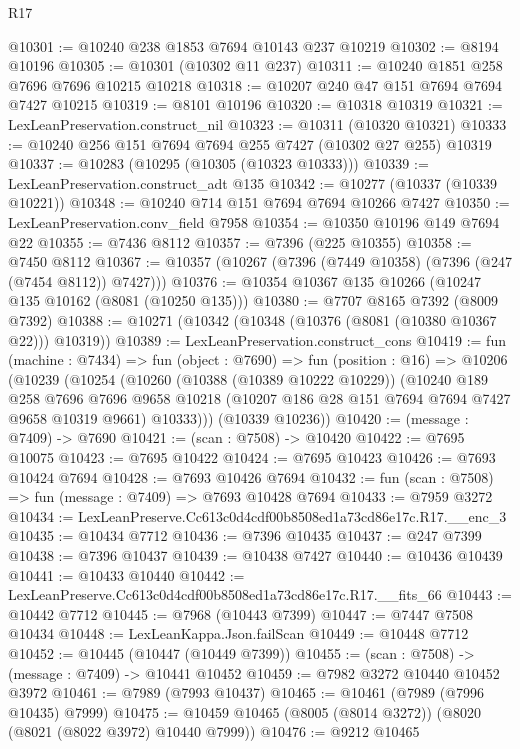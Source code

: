 \begin{lexlean}{R17}
\begin{coremodule}
@10301 := @10240 @238 @1853 @7694 @10143 @237 @10219
@10302 := @8194 @10196
@10305 := @10301 (@10302 @11 @237)
@10311 := @10240 @1851 @258 @7696 @7696 @10215 @10218
@10318 := @10207 @240 @47 @151 @7694 @7694 @7427 @10215
@10319 := @8101 @10196
@10320 := @10318 @10319
@10321 := LexLeanPreservation.construct_nil
@10323 := @10311 (@10320 @10321)
@10333 := @10240 @256 @151 @7694 @7694 @255 @7427 (@10302 @27 @255) @10319
@10337 := @10283 (@10295 (@10305 (@10323 @10333)))
@10339 := LexLeanPreservation.construct_adt @135
@10342 := @10277 (@10337 (@10339 @10221))
@10348 := @10240 @714 @151 @7694 @7694 @10266 @7427
@10350 := LexLeanPreservation.conv_field @7958
@10354 := @10350 @10196 @149 @7694 @22
@10355 := @7436 @8112
@10357 := @7396 (@225 @10355)
@10358 := @7450 @8112
@10367 := @10357 (@10267 (@7396 (@7449 @10358) (@7396 (@247 (@7454 @8112)) @7427)))
@10376 := @10354 @10367 @135 @10266 (@10247 @135 @10162 (@8081 (@10250 @135)))
@10380 := @7707 @8165 @7392 (@8009 @7392)
@10388 := @10271 (@10342 (@10348 (@10376 (@8081 (@10380 @10367 @22))) @10319))
@10389 := LexLeanPreservation.construct_cons
@10419 := fun (machine : @7434) =>
  fun (object : @7690) =>
  fun (position : @16) =>
  @10206
    (@10239
      (@10254
        (@10260
          (@10388 (@10389 @10222 @10229))
          (@10240
            @189
            @258
            @7696
            @7696
            @9658
            @10218
            (@10207 @186 @28 @151 @7694 @7694 @7427 @9658 @10319 @9661)
            @10333)))
      (@10339 @10236))
@10420 := (message : @7409) -> @7690
@10421 := (scan : @7508) -> @10420
@10422 := @7695 @10075
@10423 := @7695 @10422
@10424 := @7695 @10423
@10426 := @7693 @10424 @7694
@10428 := @7693 @10426 @7694
@10432 := fun (scan : @7508) => fun (message : @7409) => @7693 @10428 @7694
@10433 := @7959 @3272
@10434 := LexLeanPreserve.Cc613c0d4cdf00b8508ed1a73cd86e17c.R17.__enc_3
@10435 := @10434 @7712
@10436 := @7396 @10435
@10437 := @247 @7399
@10438 := @7396 @10437
@10439 := @10438 @7427
@10440 := @10436 @10439
@10441 := @10433 @10440
@10442 := LexLeanPreserve.Cc613c0d4cdf00b8508ed1a73cd86e17c.R17.__fits_66
@10443 := @10442 @7712
@10445 := @7968 (@10443 @7399)
@10447 := @7447 @7508 @10434
@10448 := LexLeanKappa.Json.failScan
@10449 := @10448 @7712
@10452 := @10445 (@10447 (@10449 @7399))
@10455 := (scan : @7508) -> (message : @7409) -> @10441 @10452
@10459 := @7982 @3272 @10440 @10452 @3972
@10461 := @7989 (@7993 @10437)
@10465 := @10461 (@7989 (@7996 @10435) @7999)
@10475 := @10459 @10465 (@8005 (@8014 @3272)) (@8020 (@8021 (@8022 @3972) @10440 @7999))
@10476 := @9212 @10465

\end{coremodule}
\end{lexlean}
